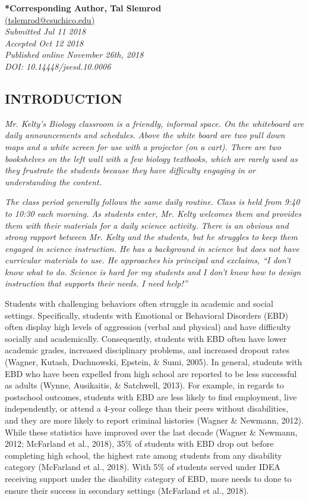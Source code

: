 \documentclass[11.5pt]{sig-alternate} %
\begin{document}
\textbf{*Corresponding Author, Tal Slemrod}\\
\href{mailto: tslemrod@csuchico.edu}{(tslemrod@csuchico.edu)} \\
\textit{Submitted  Jul 11 2018}\\
\textit{Accepted Oct 12 2018 } \\
\textit{Published online November 26th, 2018} \\
\textit{DOI: 10.14448/jsesd.10.0006} \\
\pagebreak
\clearpage
\begin{large}
\section*{INTRODUCTION}
\textit{Mr. Kelty’s Biology classroom is a friendly, informal space. On the whiteboard are daily announcements and schedules. Above the white board are two pull down maps and a white screen for use with a projector (on a cart). There are two bookshelves on the left wall with a few biology textbooks, which are rarely used as they frustrate the students because they have difficulty engaging in or understanding the content.}

\textit{The class period generally follows the same daily routine. Class is held from 9:40 to 10:30 each morning. As students enter, Mr. Kelty welcomes them and provides them with their materials for a daily science activity. There is an obvious and strong rapport between Mr. Kelty and the students, but he struggles to keep them engaged in science instruction. He has a background in science but does not have curricular materials to use. He approaches his principal and exclaims, “I don’t know what to do. Science is hard for my students and I don’t know how to design instruction that supports their needs. I need help!”}
 
Students with challenging behaviors often struggle in academic and social settings. Specifically, students with Emotional or Behavioral Disorders (EBD) often display high levels of aggression (verbal and physical) and have difficulty socially and academically. Consequently, students with EBD often have lower academic grades, increased disciplinary problems, and increased dropout rates (Wagner, Kutash, Duchnowski, Epstein, \& Sumi, 2005). In general, students with EBD who have been expelled from high school are reported to be less successful as adults (Wynne, Ausikaitis, \& Satchwell, 2013). For example, in regards to postschool outcomes, students with EBD are less likely to find employment, live independently, or attend a 4-year college than their peers without disabilities, and they are more likely to report criminal histories (Wagner \& Newmann, 2012). While these statistics have improved over the last decade (Wagner \& Newmann, 2012; McFarland et al., 2018), 35\% of students with EBD drop out before completing high school, the highest rate among students from any disability category (McFarland et al., 2018). With 5\% of students served under IDEA receiving support under the disability category of EBD, more needs to done to ensure their success in secondary settings (McFarland et al., 2018).


\end{large}
\end{document}

